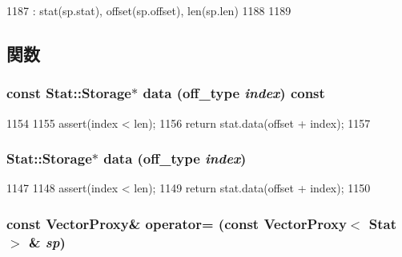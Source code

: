 \begin{DoxyCode}
1187         : stat(sp.stat), offset(sp.offset), len(sp.len)
1188     {
1189     }
\end{DoxyCode}


\subsection{関数}
\hypertarget{classStats_1_1VectorProxy_a5a6fe17c8f511349fce598271577075d}{
\subsubsection[{data}]{\setlength{\rightskip}{0pt plus 5cm}const Stat::Storage$\ast$ data ({\bf off\_\-type} {\em index}) const}}
\label{classStats_1_1VectorProxy_a5a6fe17c8f511349fce598271577075d}



\begin{DoxyCode}
1154     {
1155         assert(index < len);
1156         return stat.data(offset + index);
1157     }
\end{DoxyCode}
\hypertarget{classStats_1_1VectorProxy_ae6e824e93e6d9aa28421cfcdcc56174e}{
\subsubsection[{data}]{\setlength{\rightskip}{0pt plus 5cm}Stat::Storage$\ast$ data ({\bf off\_\-type} {\em index})}}
\label{classStats_1_1VectorProxy_ae6e824e93e6d9aa28421cfcdcc56174e}



\begin{DoxyCode}
1147     {
1148         assert(index < len);
1149         return stat.data(offset + index);
1150     }
\end{DoxyCode}
\hypertarget{classStats_1_1VectorProxy_aef02c1810ae3173d6fecdf9b9d5b2c7c}{
\subsubsection[{operator=}]{\setlength{\rightskip}{0pt plus 5cm}const {\bf VectorProxy}\& operator= (const {\bf VectorProxy}$<$ Stat $>$ \& {\em sp})}}
\label{classStats_1_1VectorProxy_aef02c1810ae3173d6fecdf9b9d5b2c7c}



